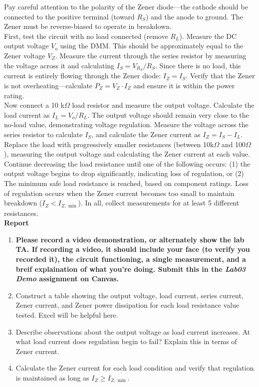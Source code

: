 \documentclass[10pt]{article}
\begin{document}
Pay careful attention to the polarity of the Zener diode—the cathode should be connected to the positive terminal (toward $R_S$) and the anode to ground. The Zener must be reverse-biased to operate in breakdown. \\


First, test the circuit with no load connected (remove $R_L$). Measure the DC output voltage $V_o$ using the DMM. This should be approximately equal to the Zener voltage $V_Z$. Measure the current through the series resistor by measuring the voltage across it and calculating $I_S = V_{R_S}/R_S$. Since there is no load, this current is entirely flowing through the Zener diode:  $I_Z = I_S$. Verify that the Zener is not overheating—calculate $P_Z = V_Z \cdot I_Z$ and ensure it is within the power rating. \\


Now connect a 10 k$\Omega$ load resistor and measure the output voltage. Calculate the load current as $I_L = V_o/R_L$. The output voltage should remain very close to the no-load value, demonstrating voltage regulation. Measure the voltage across the series resistor to calculate $I_S$, and calculate the Zener current as $I_Z = I_S - I_L$. Replace the load with progressively smaller resistances (between 10k$\Omega$ and 100$\Omega$), measuring the output voltage and calculating the Zener current at each value. \\


Continue decreasing the load resistance until one of the following occurs:  (1) the output voltage begins to drop significantly, indicating loss of regulation, or (2) The minimum safe load resistance is reached, based on component ratings.  Loss of regulation occurs when the Zener current becomes too small to maintain breakdown ($I_Z < I_{Z,\min}$). In all, collect measurements for at least 5 different resistances.\\

\textbf{Report}
\begin {enumerate}
\item \textbf{Please record a video demonstration, or alternately show the lab TA. If recording a video, it should include your face (to verify you recorded it), the circuit functioning, a single measurement, and a breif explaination of what you're doing. Submit this in the \emph{Lab03 Demo} assignment on Canvas.}
\item Construct a table showing the output voltage, load current, series current, Zener current, and Zener power dissipation for each load resistance value tested. Excel will be helpful here.
\item Describe observations about the output voltage as load current increases. At what load current does regulation begin to fail? Explain this in terms of Zener current.
\item Calculate the Zener current for each load condition and verify that regulation is maintained as long as $I_Z \geq I_{Z,\min}$.
\end {enumerate}
\end{document}

